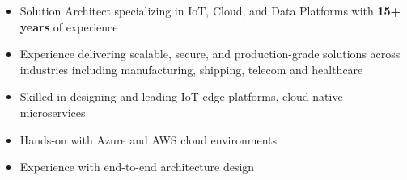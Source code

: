 

\begin{cvparagraph}

\begin{itemize}
	\item Solution Architect specializing in IoT, Cloud, and Data Platforms with \textbf{15+ years} of experience
	\item Experience delivering scalable, secure, and production-grade solutions across industries including manufacturing, shipping, telecom and healthcare
	\item Skilled in designing and leading IoT edge platforms, cloud-native microservices
	\item Hands-on with Azure and AWS cloud environments
	\item Experience with end-to-end architecture design
\end{itemize}
\end{cvparagraph}
